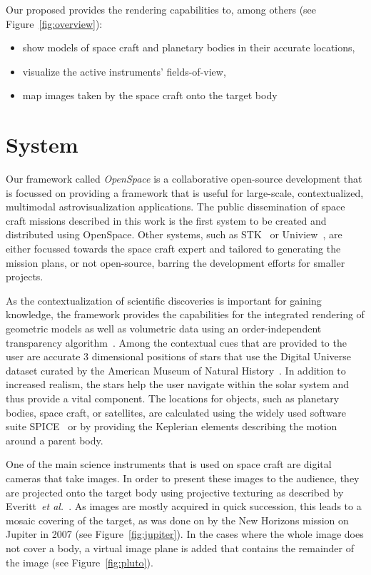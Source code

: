 \documentclass{vgtc}                          %
\begin{document}
Our proposed provides the rendering capabilities to, among others (see Figure~\ref{fig:overview}):
\begin{itemize}
\item show models of space craft and planetary bodies in their accurate locations,
\item visualize the active instruments' fields-of-view,
\item map images taken by the space craft onto the target body
\end{itemize}

\section{System}
Our framework called \emph{OpenSpace} is a collaborative open-source development that is focussed on providing a framework that is useful for large-scale, contextualized, multimodal astrovisualization applications. The public dissemination of space craft missions described in this work is the first system to be created and distributed using OpenSpace. Other systems, such as STK~\cite{stk} or Uniview~\cite{Klashed:2010tr}, are either focussed towards the space craft expert and tailored to generating the mission plans, or not open-source, barring the development efforts for smaller projects.

As the contextualization of scientific discoveries is important for gaining knowledge, the framework provides the capabilities for the integrated rendering of geometric models as well as volumetric data using an order-independent transparency algorithm~\cite{Lindholm:2014fm}. Among the contextual cues that are provided to the user are accurate 3 dimensional positions of stars that use the Digital Universe dataset curated by the American Museum of Natural History~\cite{du}. In addition to increased realism, the stars help the user navigate within the solar system and thus provide a vital component. The locations for objects, such as planetary bodies, space craft, or satellites, are calculated using the widely used software suite SPICE~\cite{naif} or by providing the Keplerian elements describing the motion around a parent body.

One of the main science instruments that is used on space craft are digital cameras that take images. In order to present these images to the audience, they are projected onto the target body using projective texturing as described by Everitt~\emph{et al.}~\cite{Everitt:2001tg}. As images are mostly acquired in quick succession, this leads to a mosaic covering of the target, as was done on by the New Horizons mission on Jupiter in 2007 (see Figure~\ref{fig:jupiter}). In the cases where the whole image does not cover a body, a virtual image plane is added that contains the remainder of the image (see Figure~\ref{fig:pluto}).
\end{document}
